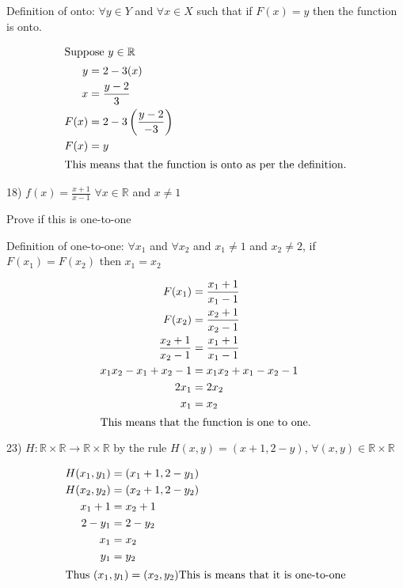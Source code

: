 \documentclass[11pt]{article}
\begin{document}
\begin{flushleft}
Definition of onto: $\forall y \in Y$ and $\forall x \in X$ such that if $F(x)=y$ then the function is onto.

\begin{align*}
\intertext{Suppose $y\in \mathbb{R}$}
y &= 2-3(x)\\
x &= \displaystyle\frac{y-2}{3}\\
F(x) &= 2-3\left(\displaystyle\frac{y-2}{-3}\right) \\
F(x) &= y\\
\intertext{This means that the function is onto as per the definition.}
\end{align*}

\hrulefill

18) $f(x) = \displaystyle\frac{x+1}{x-1}$ $\forall x \in \mathbb{R}$ and $x \neq 1$

Prove if this is one-to-one

Definition of one-to-one: $\forall x_1$ and $\forall x_2$ and $x_1 \neq 1$ and $x_2 \neq 2$, if $F(x_1)=F(x_2)$ then $x_1=x_2$

\begin{align*}
F(x_1) &= \displaystyle\frac{x_1+1}{x_1-1}\\
F(x_2) &= \displaystyle\frac{x_2+1}{x_2-1}\\
\displaystyle\frac{x_2+1}{x_2-1} &= \displaystyle\frac{x_1+1}{x_1-1}\\
x_1x_2 - x_1 +x_2-1 &= x_1x_2 + x_1 - x_2 - 1\\
2x_1 &= 2x_2 \\
x_1 &= x_2 \\   
\intertext{This means that the function is one to one.}
\end{align*}

\hrulefill

23) $H:\mathbb{R}\times \mathbb{R} \to \mathbb{R}\times \mathbb{R}$ by the rule $H(x,y) = (x+1,2-y)$, $\forall (x,y) \in \mathbb{R} \times \mathbb{R}$

\begin{align*}
H(x_1,y_1) &= (x_1+1,2-y_1)\\
H(x_2,y_2) &= (x_2+1,2-y_2)\\
x_1 + 1 &= x_2 + 1 \\
2-y_1 &= 2 - y_2 \\ 
x_1 &= x_2 \\
y_1 &= y_2 \\
\intertext{Thus $(x_1,y_1)=(x_2,y_2)$This is means that it is one-to-one}
\end{align*}





\hrulefill

\newpage

\end{flushleft}
\end{document}
